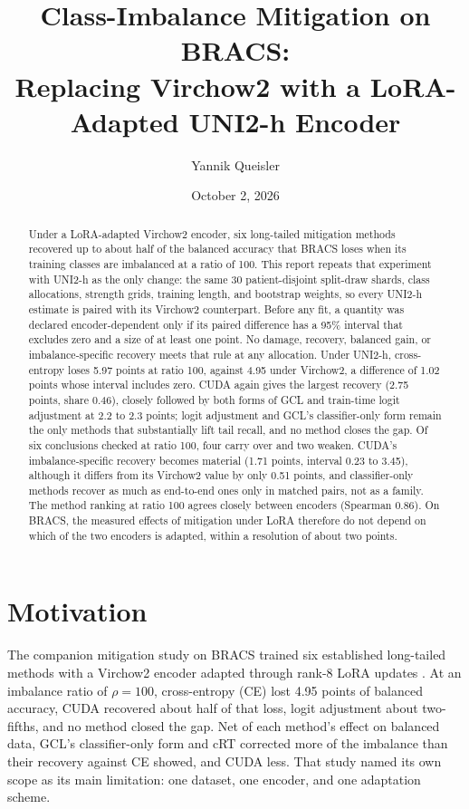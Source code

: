 \documentclass[11pt]{article}
\title{Class-Imbalance Mitigation on BRACS:\\Replacing Virchow2 with a LoRA-Adapted {UNI2-h} Encoder}
\author{Yannik Queisler}
\date{October 2, 2026}
\begin{document}
\raggedbottom
{}
\setlength{\emergencystretch}{2em}
\maketitle
\begin{abstract}
\noindent Under a LoRA-adapted Virchow2 encoder, six long-tailed mitigation methods recovered up to about half of the balanced accuracy that BRACS loses when its training classes are imbalanced at a ratio of 100. This report repeats that experiment with UNI2-h as the only change: the same 30 patient-disjoint split-draw shards, class allocations, strength grids, training length, and bootstrap weights, so every UNI2-h estimate is paired with its Virchow2 counterpart. Before any fit, a quantity was declared encoder-dependent only if its paired difference has a 95\% interval that excludes zero and a size of at least one point. No damage, recovery, balanced gain, or imbalance-specific recovery meets that rule at any allocation. Under UNI2-h, cross-entropy loses 5.97 points at ratio 100, against 4.95 under Virchow2, a difference of 1.02 points whose interval includes zero. CUDA again gives the largest recovery (2.75 points, share 0.46), closely followed by both forms of GCL and train-time logit adjustment at 2.2 to 2.3 points; logit adjustment and GCL's classifier-only form remain the only methods that substantially lift tail recall, and no method closes the gap. Of six conclusions checked at ratio 100, four carry over and two weaken. CUDA's imbalance-specific recovery becomes material (1.71 points, interval 0.23 to 3.45), although it differs from its Virchow2 value by only 0.51 points, and classifier-only methods recover as much as end-to-end ones only in matched pairs, not as a family. The method ranking at ratio 100 agrees closely between encoders (Spearman 0.86). On BRACS, the measured effects of mitigation under LoRA therefore do not depend on which of the two encoders is adapted, within a resolution of about two points.
\end{abstract}

\section{Motivation}
\label{sec:motivation}
The companion mitigation study on BRACS trained six established long-tailed methods with a Virchow2 encoder \citep{zimmermann2024virchow2} adapted through rank-8 LoRA updates \citep{queisler2026mitigationBracs}. At an imbalance ratio of $\rho=100$, cross-entropy (CE) lost 4.95 points of balanced accuracy, CUDA recovered about half of that loss, logit adjustment about two-fifths, and no method closed the gap. Net of each method's effect on balanced data, GCL's classifier-only form and cRT corrected more of the imbalance than their recovery against CE showed, and CUDA less. That study named its own scope as its main limitation: one dataset, one encoder, and one adaptation scheme.
\end{document}
